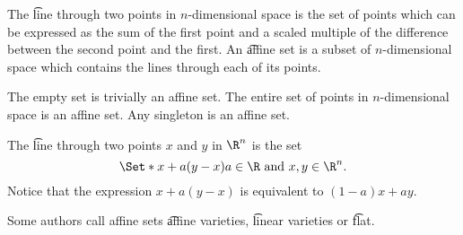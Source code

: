 
\sbasic




















\sstart
{}



The \t{line through} two points in $n$-dimensional space is the set of points which can be expressed as the sum of the first point and a scaled multiple of the difference between the second point and the first.
An \t{affine set} is a subset of $n$-dimensional space which contains the lines through each of its points.


The empty set is trivially an affine set.
The entire set of points in $n$-dimensional space is an affine set.
Any singleton is an affine set.


The \t{line through} two points $x$ and $y$ in $\R^n$ is the set
$$
  \Set*{x + a(y - x)}{a \in \R \text{ and } x, y \in \R^n}.
$$
Notice that the expression $x + a(y - x)$ is equivalent to $(1 - a)x + ay$.


Some authors call affine sets \t{affine varieties}, \t{linear varieties} or \t{flat}.
\strats
